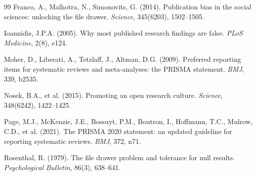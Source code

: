 \documentclass[11pt,a4paper]{article}
\begin{document}
\begin{thebibliography}{99}
Franco, A., Malhotra, N., Simonovits, G. (2014).
Publication bias in the social sciences: unlocking the file drawer.
\textit{Science}, 345(6203), 1502--1505.

Ioannidis, J.P.A. (2005).
Why most published research findings are false.
\textit{PLoS Medicine}, 2(8), e124.

Moher, D., Liberati, A., Tetzlaff, J., Altman, D.G. (2009).
Preferred reporting items for systematic reviews and meta-analyses: the PRISMA
statement.
\textit{BMJ}, 339, b2535.

Nosek, B.A., et al. (2015).
Promoting an open research culture.
\textit{Science}, 348(6242), 1422--1425.

Page, M.J., McKenzie, J.E., Bossuyt, P.M., Boutron, I., Hoffmann, T.C.,
Mulrow, C.D., et al. (2021).
The PRISMA 2020 statement: an updated guideline for reporting systematic
reviews.
\textit{BMJ}, 372, n71.

Rosenthal, R. (1979).
The file drawer problem and tolerance for null results.
\textit{Psychological Bulletin}, 86(3), 638--641.

\end{thebibliography}
\end{document}

